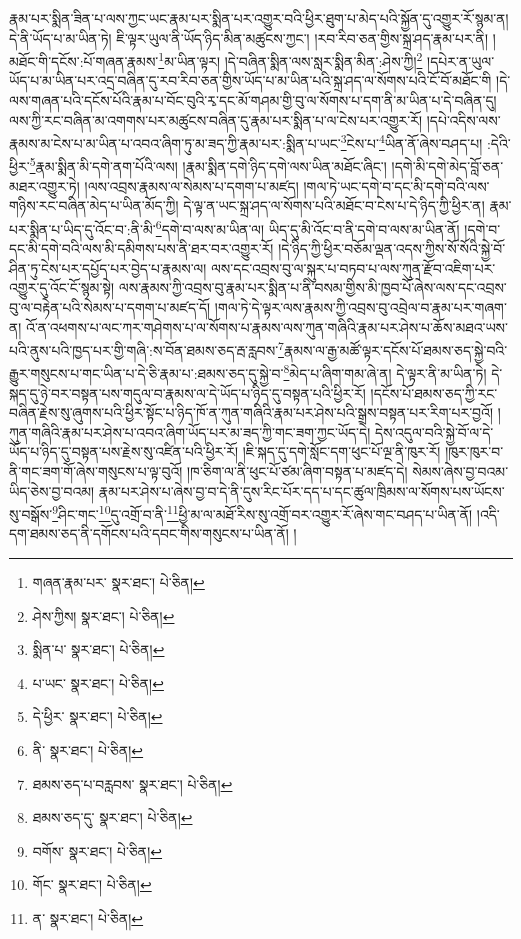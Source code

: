 རྣམ་པར་སྨིན་ཟིན་པ་ལས་ཀྱང་ཡང་རྣམ་པར་སྨིན་པར་འགྱུར་བའི་ཕྱིར་ཐུག་པ་མེད་པའི་སྐྱོན་དུ་འགྱུར་རོ་སྙམ་ན། དེ་ནི་ཡོད་པ་མ་ཡིན་ཏེ། ཇི་ལྟར་ཡུལ་ནི་ཡོད་ཉིད་མིན་མཚུངས་ཀྱང་། །རབ་རིབ་ཅན་གྱིས་སྐྲ་ཤད་རྣམ་པར་ནི། །མཐོང་གི་དངོས་:པོ་གཞན་རྣམས་\footnote{གཞན་རྣམ་པར་  སྣར་ཐང་།  པེ་ཅིན། }མ་ཡིན་ལྟར། །དེ་བཞིན་སྨིན་ལས་སླར་སྨིན་མིན་:ཤེས་ཀྱི།\footnote{ཤེས་ཀྱིས།  སྣར་ཐང་།  པེ་ཅིན། } །དཔེར་ན་ཡུལ་ཡོད་པ་མ་ཡིན་པར་འདྲ་བཞིན་དུ་རབ་རིབ་ཅན་གྱིས་ཡོད་པ་མ་ཡིན་པའི་སྐྲ་ཤད་ལ་སོགས་པའི་ངོ་བོ་མཐོང་གི །དེ་ལས་གཞན་པའི་དངོས་པོའི་རྣམ་པ་བོང་བུའི་རྭ་དང་མོ་གཤམ་གྱི་བུ་ལ་སོགས་པ་དག་ནི་མ་ཡིན་པ་དེ་བཞིན་དུ། ལས་ཀྱི་རང་བཞིན་མ་འགགས་པར་མཚུངས་བཞིན་དུ་རྣམ་པར་སྨིན་པ་ལ་ངེས་པར་འགྱུར་རོ། །དཔེ་འདིས་ལས་རྣམས་མ་ངེས་པ་མ་ཡིན་པ་འབའ་ཞིག་ཏུ་མ་ཟད་ཀྱི་རྣམ་པར་:སྨིན་པ་ཡང་\footnote{སྨིན་པ་  སྣར་ཐང་།  པེ་ཅིན། }ངེས་པ་\footnote{པ་ཡང་  སྣར་ཐང་།  པེ་ཅིན། }ཡིན་ནོ་ཞེས་བཤད་པ། :དེའི་ཕྱིར་\footnote{དེ་ཕྱིར་  སྣར་ཐང་།  པེ་ཅིན། }རྣམ་སྨིན་མི་དགེ་ནག་པོའི་ལས། །རྣམ་སྨིན་དགེ་ཉིད་དགེ་ལས་ཡིན་མཐོང་ཞིང་། །དགེ་མི་དགེ་མེད་བློ་ཅན་མཐར་འགྱུར་ཏེ། །ལས་འབྲས་རྣམས་ལ་སེམས་པ་དགག་པ་མཛད། །གལ་ཏེ་ཡང་དགེ་བ་དང་མི་དགེ་བའི་ལས་གཉིས་རང་བཞིན་མེད་པ་ཡིན་མོད་ཀྱི། དེ་ལྟ་ན་ཡང་སྐྲ་ཤད་ལ་སོགས་པའི་མཐོང་བ་ངེས་པ་དེ་ཉིད་ཀྱི་ཕྱིར་ན། རྣམ་པར་སྨིན་པ་ཡིད་དུ་འོང་བ་:ནི་མི་\footnote{ནི་  སྣར་ཐང་།  པེ་ཅིན། }དགེ་བ་ལས་མ་ཡིན་ལ། ཡིད་དུ་མི་འོང་བ་ནི་དགེ་བ་ལས་མ་ཡིན་ནོ། །དགེ་བ་དང་མི་དགེ་བའི་ལས་མི་དམིགས་པས་ནི་ཐར་བར་འགྱུར་རོ། །དེ་ཉིད་ཀྱི་ཕྱིར་བཅོམ་ལྡན་འདས་ཀྱིས་སོ་སོའི་སྐྱེ་བོ་ཤིན་ཏུ་ངེས་པར་དཔྱོད་པར་བྱེད་པ་རྣམས་ལ། ལས་དང་འབྲས་བུ་ལ་སྐུར་པ་བཏབ་པ་ལས་ཀུན་རྫོབ་འཇིག་པར་འགྱུར་དུ་འོང་ངོ་སྙམ་སྟེ། ལས་རྣམས་ཀྱི་འབྲས་བུ་རྣམ་པར་སྨིན་པ་ནི་བསམ་གྱིས་མི་ཁྱབ་པོ་ཞེས་ལས་དང་འབྲས་བུ་ལ་བརྟེན་པའི་སེམས་པ་དགག་པ་མཛད་དོ། །གལ་ཏེ་དེ་ལྟར་ལས་རྣམས་ཀྱི་འབྲས་བུ་འབྲེལ་བ་རྣམ་པར་གཞག་ན། འོ་ན་འཕགས་པ་ལང་ཀར་གཤེགས་པ་ལ་སོགས་པ་རྣམས་ལས་ཀུན་གཞིའི་རྣམ་པར་ཤེས་པ་ཆོས་མཐའ་ཡས་པའི་ནུས་པའི་ཁྱད་པར་གྱི་གཞི་:ས་བོན་ཐམས་ཅད་རྦ་རླབས་\footnote{ཐམས་ཅད་པ་བརླབས་  སྣར་ཐང་།  པེ་ཅིན། }རྣམས་ལ་རྒྱ་མཚོ་ལྟར་དངོས་པོ་ཐམས་ཅད་སྐྱེ་བའི་རྒྱུར་གསུངས་པ་གང་ཡིན་པ་དེ་ཅི་རྣམ་པ་:ཐམས་ཅད་དུ་སྐྱེ་བ་\footnote{ཐམས་ཅད་དུ་  སྣར་ཐང་།  པེ་ཅིན། }མེད་པ་ཞིག་གམ་ཞེ་ན། དེ་ལྟར་ནི་མ་ཡིན་ཏེ། དེ་སྐད་དུ་ཉེ་བར་བསྟན་པས་གདུལ་བ་རྣམས་ལ་དེ་ཡོད་པ་ཉིད་དུ་བསྟན་པའི་ཕྱིར་རོ། །དངོས་པོ་ཐམས་ཅད་ཀྱི་རང་བཞིན་རྗེས་སུ་ཞུགས་པའི་ཕྱིར་སྟོང་པ་ཉིད་ཁོ་ན་ཀུན་གཞིའི་རྣམ་པར་ཤེས་པའི་སྒྲས་བསྟན་པར་རིག་པར་བྱའོ། །ཀུན་གཞིའི་རྣམ་པར་ཤེས་པ་འབའ་ཞིག་ཡོད་པར་མ་ཟད་ཀྱི་གང་ཟག་ཀྱང་ཡོད་དེ། དེས་འདུལ་བའི་སྐྱེ་བོ་ལ་དེ་ཡོད་པ་ཉིད་དུ་བསྟན་པས་རྗེས་སུ་འཛིན་པའི་ཕྱིར་རོ། །ཇི་སྐད་དུ་དགེ་སློང་དག་ཕུང་པོ་ལྔ་ནི་ཁུར་རོ། །ཁུར་ཁུར་བ་ནི་གང་ཟག་གོ་ཞེས་གསུངས་པ་ལྟ་བུའོ། །ཁ་ཅིག་ལ་ནི་ཕུང་པོ་ཙམ་ཞིག་བསྟན་པ་མཛད་དེ། སེམས་ཞེས་བྱ་བའམ་ཡིད་ཅེས་བྱ་བའམ། རྣམ་པར་ཤེས་པ་ཞེས་བྱ་བ་དེ་ནི་དུས་རིང་པོར་དད་པ་དང་ཚུལ་ཁྲིམས་ལ་སོགས་པས་ཡོངས་སུ་བསྒོས་\footnote{བགོས་  སྣར་ཐང་།  པེ་ཅིན། }ཤིང་གང་\footnote{གོང་  སྣར་ཐང་།  པེ་ཅིན། }དུ་འགྲོ་བ་ནི་\footnote{ན་  སྣར་ཐང་།  པེ་ཅིན། }ཕྱི་མ་ལ་མཐོ་རིས་སུ་འགྲོ་བར་འགྱུར་རོ་ཞེས་གང་བཤད་པ་ཡིན་ནོ། །འདི་དག་ཐམས་ཅད་ནི་དགོངས་པའི་དབང་གིས་གསུངས་པ་ཡིན་ནོ། །
